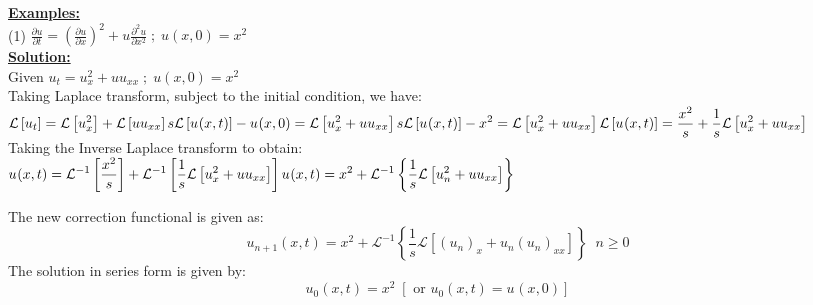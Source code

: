 \documentclass[a4paper 11pt]{article}
\newcommand{\Laplace}{\mathcal{L}}
\newcommand{\sbracket}[1]{\left[#1\right]}
\newcommand{\Un}[2]{u_{#1}(#2)}
\newcommand{\NI}{\noindent}
\newcommand{\InverseL}[1]{\Laplace^{-1}\left[#1\right]}
\newcommand{\LT}[1]{\Laplace \left[#1\right]}
\newcommand{\Unx}[1]{\Un{#1}{x,t}}
\newcommand{\InverseLx}[1]{\Laplace^{-1}\left\{ #1 \right\}}
\begin{document}
\newpage
\NI \textbf{\underline{Examples:}}\\[0.4cm]
(1) $\displaystyle
\frac{\partial u}{\partial t} = \left( \frac{\partial u}{\partial x}\right)^2 + u\frac{\partial^2 u}{\partial x^2} \; ; \; u(x,0) = x^2
$\\[0.4cm]
\NI \textbf{\underline{Solution:}}\\[0.2cm]
Given $\displaystyle u_t = u_{x}^{2} + u u_{xx} \; ; \; u(x,0) = x^2$\\[0.25cm]
Taking Laplace transform, subject to the initial condition, we  have:\\[0.2cm]
$\displaystyle
\LT{u_t} = \LT{u_{x}^{2}} + \LT{uu_{xx}}\\[0.2cm]
s\LT{\Un{}{x,t}} - \Un{}{x,0} = \LT{u_{x}^{2} + uu_{xx}} \\[0.2cm]
s\LT{\Un{}{x,t}} - x^2 = \LT{u_{x}^{2} + uu_{xx}} \\[0.2cm]
\LT{\Un{}{x,t}} = \frac{x^2}{s} + \frac{1}{s}\LT{u_{x}^{2} + uu_{xx}}
$\\[0.2cm]
Taking the Inverse Laplace transform to obtain:\\[0.3cm]
$\displaystyle
\Unx{} = \InverseL{\frac{x^2}{s}} + \InverseL{\frac{1}{s}\LT{u_{x}^{2} + uu_{xx}}} \\[0.2cm]
\Un{}{x,t} = x^2 + \InverseLx{\frac{1}{s}\LT{u_{n}^{2} + uu_{xx}}}
$

\NI The new correction functional is given as:
$$
\Unx{n+1} = x^2 + \InverseLx{\frac{1}{s}\LT{(u_n)_x + u_{n}(u_n)_{xx}}} \; \; n \geq 0
$$
The solution in series form is given by:\\[0.2cm]
$$
\Un{0}{x,t} = x^2 \; \sbracket{\text{ or } \Unx{0} = \Un{}{x,0}}
$$
\end{document}
